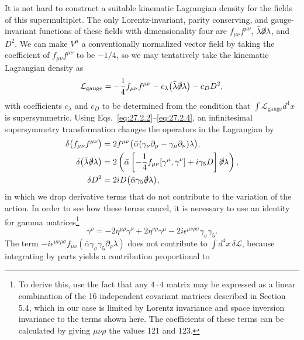 It is not hard to construct a suitable kinematic Lagrangian density for
the fields of this supermultiplet. The only Lorentz-invariant, parity
conserving, and gauge-invariant functions of these fields with
dimensionality four are \(f_{\mu\nu}f^{\mu\nu}\),
\(\bar\lambda\sl{\partial}\lambda\), and \(D^2\). We can make \(V^\mu\) a
conventionally normalized vector field by taking the coefficient of
\(f_{\mu\nu}f^{\mu\nu}\) to be \(-1/4\), so we may tentatively take the
kinematic Lagrangian density as
\[
  \mathcal{L}_{\mathrm{gauge}}
  =-\frac14 f_{\mu\nu}f^{\mu\nu}
  -c_\lambda\bigl(\bar\lambda\sl{\partial}\lambda\bigr)
  -c_DD^2,
\]
with coefficients \(c_\lambda\) and \(c_D\) to be determined from the
condition that \(\int\mathcal{L}_{\mathrm{gauge}}d^4x\) is supersymmetric.
Using Eqs.~\eqref{eq:27.2.2}--\eqref{eq:27.2.4}, an infinitesimal
supersymmetry transformation changes the operators in the Lagrangian by
\[
  \begin{aligned}
  \delta\bigl(f_{\mu\nu}f^{\mu\nu}\bigr)
  &=2f^{\mu\nu}
    \bigl(\bar\alpha(\gamma_\nu\partial_\mu
      -\gamma_\mu\partial_\nu)\lambda\bigr),
  \\
  \delta\bigl(\bar\lambda\sl{\partial}\lambda\bigr)
  &=2\left(
    \bar\alpha\left[-\frac14f_{\mu\nu}[\gamma^\mu,\gamma^\nu]
      +i\gamma_5D\right]\sl{\partial}\lambda
  \right),
  \\
  \delta D^2&=2iD\bigl(\bar\alpha\gamma_5\sl{\partial}\lambda\bigr),
  \end{aligned}
\]
in which we drop derivative terms that do not contribute to the variation
of the action. In order to see how these terms cancel, it is necessary to
use an identity for gamma matrices\footnote{To derive this, use the fact
that any \(4\cdot4\) matrix may be expressed as a linear combination of
the 16 independent covariant matrices described in Section 5.4, which in
our case is limited by Lorentz invariance and space inversion invariance
to the terms shown here. The coefficients of these terms can be calculated
by giving \(\mu\nu\rho\) the values 121 and 123.}
\begin{equation}
  [\gamma^\mu,\gamma^\nu]\gamma^\rho
  =-2\eta^{\mu\rho}\gamma^\nu
  +2\eta^{\nu\rho}\gamma^\mu
  -2i\epsilon^{\mu\nu\rho\sigma}\gamma_\sigma\gamma_5.
  \tag{27.2.5}\label{eq:27.2.5}
\end{equation}
The term
\(-i\epsilon^{\mu\nu\rho\sigma}f_{\mu\nu}
(\bar\alpha\gamma_\sigma\gamma_5\partial_\rho\lambda)\)
does not contribute to \(\int d^4x\,\delta\mathcal{L}\), because
integrating by parts yields a contribution proportional to
